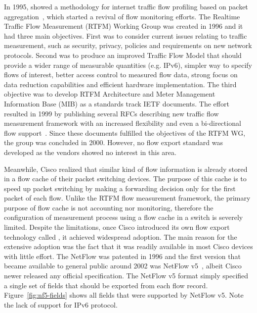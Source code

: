 In 1995, \citeauthor{Claffy-1995-Parameterizable} showed a methodology for internet traffic flow profiling based on packet aggregation~\cite{Claffy-1995-Parameterizable}, which started a revival of flow monitoring efforts. The Realtime Traffic Flow  Measurement (RTFM) Working Group was created in 1996 and it had three main objectives. First was to consider current issues relating to traffic measurement, such as security, privacy, policies and requirements on new network protocols. Second was to produce an improved Traffic Flow Model that should provide a wider range of measurable quantities (e.g. IPv6), simpler way to specify flows of interest, better access control  to measured flow data, strong focus on data reduction capabilities and efficient hardware implementation. The third objective was to develop RTFM Architecture and Meter Management Information Base (MIB) as a standards track IETF documents. The effort resulted in 1999 by publishing several RFCs describing new traffic flow measurement framework with an increased flexibility and even a bi-directional flow support~\cite{rfc2722}. Since these documents fulfilled the objectives of the RTFM WG, the group was concluded in 2000. However, no flow export standard was developed as the vendors showed no interest in this area.

Meanwhile, Cisco realized that similar kind of flow information is already stored in a flow cache of their packet switching devices. The purpose of this cache is to speed up packet switching by making a forwarding decision only for the first packet of each flow. Unlike the RTFM flow measurement framework, the primary purpose of flow cache is not accounting nor monitoring, therefore the configuration of measurement process using a flow cache in a switch is severely limited. Despite the limitations, once Cisco introduced its own flow export technology called , it achieved widespread adoption. The main reason for the extensive adoption was the fact that it was readily available in most Cisco devices with little effort. The NetFlow was patented in 1996 and the first version that became available to general public around 2002 was NetFlow v5~\cite{CiscoSystems-2007-NetFlow}, albeit Cisco newer released any official specification. The NetFlow v5 format simply specified a single set of fields that should be exported from each flow record. Figure~\ref{fig:nf5-fields} shows all fields that were supported by NetFlow v5. Note the lack of support for IPv6 protocol.

